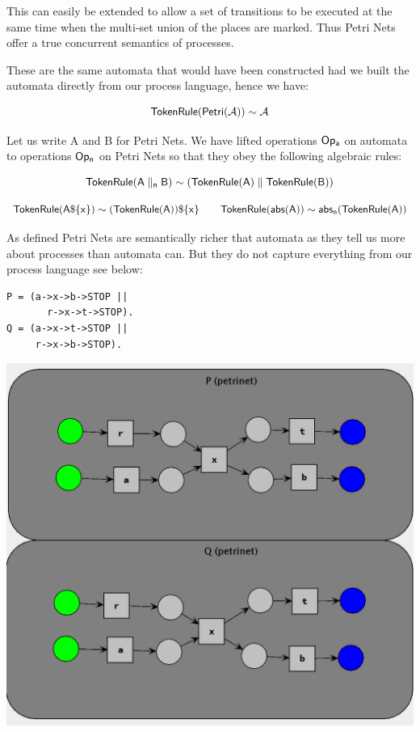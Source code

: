 \documentclass[]{article}
\begin{document}
 This can easily be extended to allow a set of transitions to be executed at the same time when the multi-set union of the places are marked. Thus Petri Nets offer a {\sf true concurrent } semantics of processes.
 
 
 
  These are the same automata that would have been constructed had we built the automata directly from our process language, hence we have:

\[{\sf TokenRule(Petri(\mathcal{A}))\sim  \mathcal{A}}\]

Let us write {\sf A} and {\sf B} for Petri Nets. We have   lifted   operations ${\sf Op_a}$ on automata to   operations ${\sf Op_n}$ on Petri Nets  so that they obey  the following algebraic rules:

\[{\sf TokenRule({\sf A}\parallel_n {\sf B})\sim  (TokenRule({\sf A})\parallel TokenRule({\sf B})) }\]

\[{\sf TokenRule({\sf A}\$\{x\}) \sim  (TokenRule({\sf A}))\$\{x\}  \qquad     TokenRule(abs({\sf A}))\sim  abs_n(TokenRule({\sf A})) }\]


As defined Petri Nets are semantically richer that automata as they tell us more about processes than automata can. But they do not capture everything from our process language see below:

\begin{minipage}{0.25\textwidth}
\begin{verbatim}
P = (a->x->b->STOP || 
       r->x->t->STOP).
Q = (a->x->t->STOP || 
     r->x->b->STOP).
  \end{verbatim}
\end{minipage}\begin{minipage}{0.7\textwidth}
\begin{center}\includegraphics[scale=0.4]{EquNets.png}\end{center}
\end{minipage}
\end{document}
